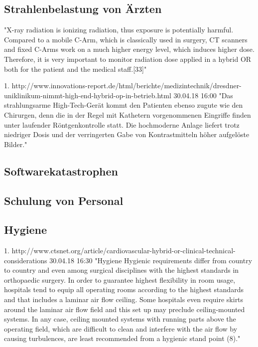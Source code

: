 \subsection{Strahlenbelastung von Ärzten}
	"X-ray radiation is ionizing radiation, thus exposure is potentially harmful. Compared to a mobile C-Arm, which is classically used in surgery, CT scanners and fixed C-Arms work on a much higher energy level, which induces higher dose. Therefore, it is very important to monitor radiation dose applied in a hybrid OR both for the patient and the medical staff.[33]"
	
1. http://www.innovations-report.de/html/berichte/medizintechnik/dresdner-uniklinikum-nimmt-high-end-hybrid-op-in-betrieb.html	 30.04.18 16:00
	"Das strahlungsarme High-Tech-Gerät kommt den Patienten ebenso zugute wie den Chirurgen, denn die in der Regel mit Kathetern vorgenommenen Eingriffe finden unter laufender Röntgenkontrolle statt. Die hochmoderne Anlage liefert trotz niedriger Dosis und der verringerten Gabe von Kontrastmitteln höher aufgelöste Bilder."


\subsection{Softwarekatastrophen}

\subsection{Schulung von Personal}

\subsection{Hygiene}
1. http://www.ctsnet.org/article/cardiovascular-hybrid-or-clinical-technical-considerations 30.04.18 16:30
	"Hygiene
	Hygienic requirements differ from country to country and even among surgical disciplines with the highest standards in orthopaedic surgery. In order to guarantee highest flexibility in room usage, hospitals tend to equip all operating rooms according to the highest standards and that includes a laminar air flow ceiling. Some hospitals even require skirts around the laminar air flow field and this set up may preclude ceiling-mounted systems. In any case, ceiling mounted systems with running parts above the operating field, which are difficult to clean and interfere with the air flow by causing turbulences, are least recommended from a hygienic stand point (8)."
	
